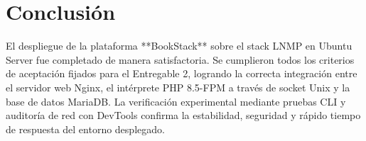 \documentclass[12pt,a4paper]{article}
\begin{document}
\section{Conclusión}
El despliegue de la plataforma **BookStack** sobre el stack LNMP en Ubuntu Server fue completado de manera satisfactoria. Se cumplieron todos los criterios de aceptación fijados para el Entregable 2, logrando la correcta integración entre el servidor web Nginx, el intérprete PHP 8.5-FPM a través de socket Unix y la base de datos MariaDB. La verificación experimental mediante pruebas CLI y auditoría de red con DevTools confirma la estabilidad, seguridad y rápido tiempo de respuesta del entorno desplegado.
\end{document}
